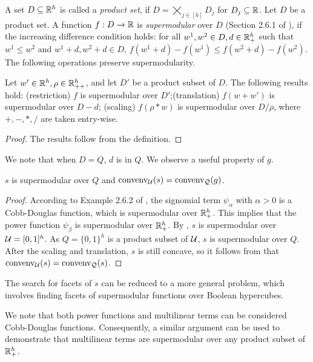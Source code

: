  A set $D \subseteq \mathbb R^h$ is called a \emph{product set}, if  $D = \bigtimes_{j \in [h]}D_j$ for $D_j \subseteq \mathbb R$. Let $D$ be a product set. A function $f: D  \to \mathbb R$ is \emph{supermodular} over $D$ (Section 2.6.1 of \cite{topkis2011supermodularity}), if the increasing difference condition holds:
for all $w^1,w^2 \in D, d \in \mathbb R^h_{+}$ such that $w^1 \le w^2 $ and $ w^1+d, w^2+d \in D$, $f(w^1+d) -f(w^1)\le f(w^2 + d) -f(w^2)$. 
The following operations preserve supermodularity. 

\begin{lemma}
\label{lem.subtrans}
    Let $w' \in \mathbb R^h, \rho \in \mathbb R^h_{++}$,  and let $D'$ be a product subset of $D$. The following results hold: (restriction) $f$ is supermodular over $D'$;(translation) $ f(w+w')$ is supermodular over $D-d$; (scaling) $f(\rho * w)$ is supermodular over $D/\rho$, where $+, -, *, /$ are taken entry-wise.
\end{lemma}
\begin{proof}
    The results follow from the definition.
\end{proof}


 We note that when $D= Q$, $d$ is in $Q$.  We observe a useful property of $g$. 
 
\begin{proposition}
\label{lem.sup}
$s$ is supermodular over $Q$ and $\operatorname{convenv}_{\mathcal U}(s) = \operatorname{convenv}_{\mathcal Q}(g)$.
\end{proposition}
\begin{proof} 
According to Example 2.6.2 of \cite{topkis2011supermodularity}, the signomial term
$\psi_\alpha$ with $\alpha > 0$ is a Cobb-Douglas function, which is supermodular  over $\mathbb R^h_{+}$. This implies that the power function $\psi_\beta$ is supermodular over $\mathbb R^h_+$. By , $s$ is supermodular over $\mathcal U = [0,1]^h$. As $Q=\{0,1\}^h$ is a product subset of $\mathcal U$,   $s$  is supermodular over $Q$. After the scaling and translation, $s$ is still concave, so it follows from  that $\operatorname{convenv}_{\mathcal U}(s) = \operatorname{convenv}_{\mathcal Q}(s)$.
\end{proof}

The search for facets of $s$ can be reduced to a more general problem, which involves finding facets of supermodular functions over  Boolean hypercubes.

We note that both power functions and multilinear terms can be considered Cobb-Douglas functions. Consequently, a similar argument can be used to demonstrate that multilinear terms are supermodular over any product subset of $\mathbb R^h_+$.
  
